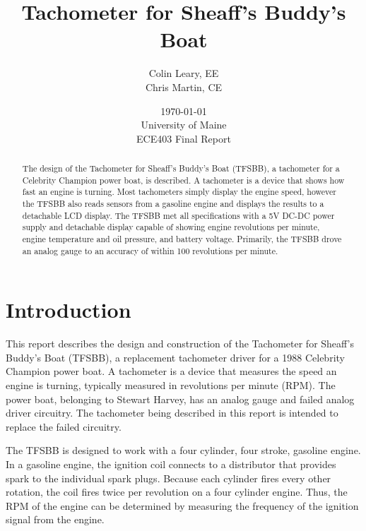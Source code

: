 \documentclass[11pt]{article}
\begin{document}
\title{ \textbf{Tachometer for Sheaff's Buddy's Boat}}
\author{Colin Leary, EE \\ Chris Martin, CE}
\date{\today\\[2ex]%
University of Maine\\%
ECE403 Final Report}
\maketitle
\newpage
\clearpage

\begin{abstract}
The design of the Tachometer for Sheaff's Buddy's Boat (TFSBB), a tachometer for a Celebrity Champion power boat, is described. A tachometer is a device that shows how fast an engine is turning. Most tachometers simply display the engine speed, however the TFSBB also reads sensors from a gasoline engine and displays the results to a  detachable LCD display. The TFSBB met all specifications with a 5V DC-DC power supply and detachable display capable of showing engine revolutions per minute, engine temperature and oil pressure, and battery voltage. Primarily, the TFSBB drove an analog gauge to an accuracy of within 100 revolutions per minute.

\end{abstract}
\newpage
\clearpage

\begin{singlespacing}
    \tableofcontents
    \newpage
    \clearpage

    \listoffigures
    \newpage
    \clearpage

\end{singlespacing}

\section{Introduction}
\label{sec:intro}
This report describes the design and construction of the Tachometer for Sheaff's Buddy's Boat (TFSBB), a replacement tachometer driver for a 1988 Celebrity Champion power boat. A tachometer is a device that measures the speed an engine is turning, typically measured in revolutions per minute (RPM).  The power boat, belonging to Stewart Harvey, has an analog gauge and failed analog driver circuitry. The tachometer being described in this report is intended to replace the failed circuitry.

The TFSBB is designed to work with a four cylinder, four stroke, gasoline engine. In a gasoline engine, the ignition coil connects to a distributor that provides spark to the individual spark plugs. Because each cylinder fires every other rotation, the coil fires twice per revolution on a four cylinder engine. Thus, the RPM of the engine can be determined by measuring the frequency of the ignition signal from the engine. %
\end{document}

